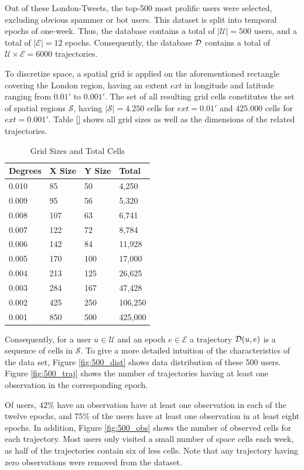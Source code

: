Out of these London-Tweets, the top-500 most prolific users were selected, excluding obvious spammer or bot users. This dataset is split into temporal epochs of one-week. Thus, the database contains a total of $|\mathcal{U}|=500$ users, and a total of $|\mathcal{E}|=12$ epochs. Consequently, the database $\mathcal{D}$ contains a total of $\mathcal{U}\times\mathcal{E}=6000$ trajectories.

To discretize space, a spatial grid is applied on the aforementioned rectangle covering the London region, having an extent $ext$ in longitude and latitude ranging from $0.01'$ to $0.001'$. The set of all resulting grid cells constitutes the set of spatial regions $\mathcal{S}$, having $|\mathcal{S}|=4.250$ cells for $ext=0.01'$ and $425.000$ cells for $ext=0.001'$. Table \ref{} shows all grid sizes as well as the dimensions of the related trajectories.

\begin{table}
  \centering
  \caption{Grid Sizes and Total Cells}
  \begin{tabular}{|l|l|l|l|}
    \hline
		{\bf Degrees} & {\bf X Size} & {\bf Y Size} & {\bf Total} \\\hline
		0.010 & 85 & 50 & 4,250 \\\hline
		0.009 & 95 & 56 & 5,320 \\\hline
		0.008 & 107 & 63 & 6,741 \\\hline
		0.007 & 122 & 72 & 8,784 \\\hline
		0.006 & 142 & 84 & 11,928 \\\hline
		0.005 & 170 & 100 & 17,000 \\\hline
		0.004 & 213 & 125 & 26,625 \\\hline
		0.003 & 284 & 167 & 47,428 \\\hline
		0.002 & 425 & 250 & 106,250 \\\hline
		0.001 & 850 & 500 & 425,000 \\\hline
	\end{tabular}
  \tableSpace
\end{table}

Consequently, for a user $u\in\mathcal{U}$ and an epoch $e\in\mathcal{E}$ a trajectory $\mathcal{D}(u,e)$ is a sequence of cells in $\mathcal{S}$. To give a more detailed intuition of the characteristics of the data set, Figure \ref{fig:500_dist} shows data distribution of these 500 users. Figure \ref{fig:500_traj} shows the number of trajectories having at least one observation in the corresponding epoch.

Of users, $42\%$ have an observation have at least one observation in each of the twelve epochs, and $75\%$ of the users have at least one observation in at least eight epochs. In addition, Figure \ref{fig:500_obs} shows the number of observed cells for each trajectory. Most users only visited a small number of space cells each week, as half of the trajectories contain six of less cells. Note that any trajectory having zero observations were removed from the dataset.

